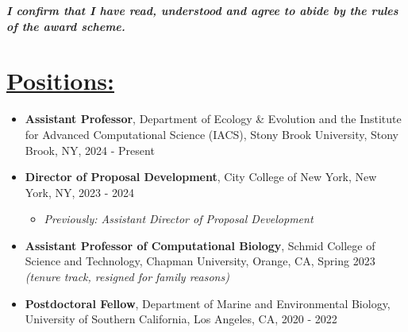 \documentclass[]{res}
\begin{document}
 
 \small
{} %
 
 

\address{{\bf pronouns:} they/them/theirs {\emph{or}} she/her/hers\\ {\bf email:} jackie.weissman@stonybrook.edu}
\address{{\bf website:} https://microbialgamut.com/}%

 
\begin{resume} 

\begin{center}
{\large{\emph{\bf I confirm that I have read, understood and agree to abide by the rules of the award scheme.}}}
\end{center}


 \section{\underline{Positions:}} %
\begin{itemize}[leftmargin=*]
\setlength\itemsep{0.5em}
\item[] {\bf Assistant Professor}, Department of Ecology \& Evolution and the Institute for Advanced Computational Science (IACS), Stony Brook University, Stony Brook, NY, 2024 - Present
\item[] {\bf Director of Proposal Development}, City College of New York, New York, NY, 2023 - 2024
\begin{itemize}[leftmargin=*]
\item \emph{Previously: Assistant Director of Proposal Development}
\end{itemize}
\item[] {\bf Assistant Professor of Computational Biology}, Schmid College of Science and Technology, Chapman University, Orange, CA, Spring 2023 \emph{(tenure track, resigned for family reasons)}
\item[] {\bf Postdoctoral Fellow}, Department of Marine and Environmental Biology, University of Southern California, Los Angeles, CA, 2020 - 2022


\end{itemize}
\end{resume}
\end{document}
